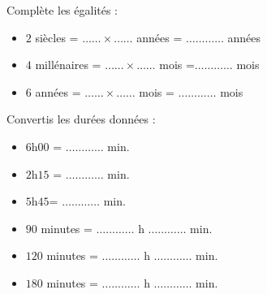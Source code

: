 \begin{pageParcoursu}


 Complète les égalités :\vspace{0.2cm}
 \begin{itemize}
 \item $2$ siècles =  $\ldots\ldots \times \ldots \ldots $ années = $\ldots \ldots \ldots\ldots$ années \vspace{0.2cm}
 \item $4$ millénaires = $\ldots \ldots\times \ldots \ldots $ mois =$\ldots \ldots\ldots\ldots $ mois \vspace{0.2cm}
 \item $6$ années = $\ldots\ldots \times \ldots \ldots $ mois = $\ldots \ldots\ldots\ldots$ mois \vspace{0.2cm}
 \end{itemize}


Convertis les durées données :\vspace{0.2cm}

\begin{minipage}{0.50\linewidth}
 \begin{itemize}
 \item $6$h$00$ =  $\ldots \ldots\ldots\ldots $ min.  \vspace{0.2cm}
 \item $2$h$15$ =  $\ldots \ldots\ldots\ldots $ min. \vspace{0.2cm}
 \item $5$h$45$=  $\ldots \ldots\ldots\ldots $ min. \vspace{0.2cm}
 \end{itemize}
\end{minipage}
\begin{minipage}{0.50\linewidth}
 \begin{itemize}
 \item $90$ minutes  =  $\ldots \ldots \ldots \ldots $ h $\ldots \ldots \ldots \ldots $ min. \vspace{0.2cm}
 \item $120$ minutes = $\ldots \ldots \ldots \ldots $ h $\ldots \ldots \ldots \ldots $ min. \vspace{0.2cm}
 \item $180$ minutes = $\ldots \ldots \ldots \ldots $ h $\ldots \ldots \ldots \ldots $ min. \vspace{0.2cm}
 \end{itemize}
\end{minipage}




\end{pageParcoursu}
